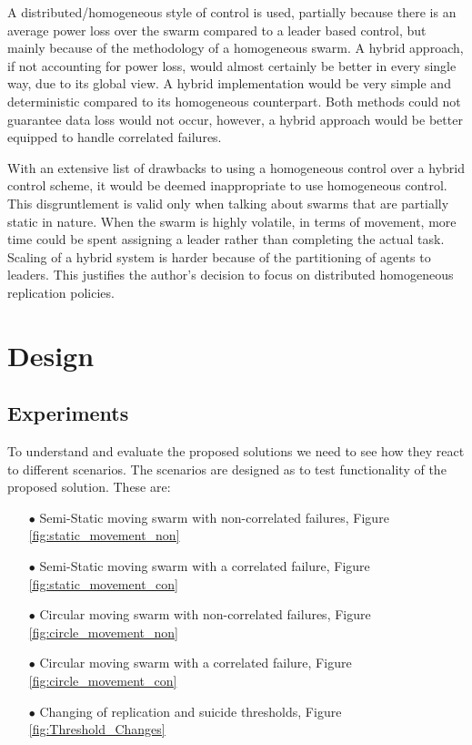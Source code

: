\documentclass{UoYCSproject}
\begin{document}
A distributed/homogeneous style of control is used, partially because there is an average power loss over the swarm compared to a leader based control, but mainly because of the methodology of a homogeneous swarm. A hybrid approach, if not accounting for power loss, would almost certainly be better in every single way, due to its global view. A hybrid implementation would be very simple and deterministic compared to its homogeneous counterpart. Both methods could not guarantee data loss would not occur, however, a hybrid approach would be better equipped to handle correlated failures.

With an extensive list of drawbacks to using a homogeneous control over a hybrid control scheme, it would be deemed inappropriate to use homogeneous control. This disgruntlement is valid only when talking about swarms that are partially static in nature. When the swarm is highly volatile, in terms of movement, more time could be spent assigning a leader rather than completing the actual task. Scaling of a hybrid system is harder because of the partitioning of agents to leaders. This justifies the author's decision to focus on distributed homogeneous replication policies.




\chapter{Design}
\label{cha:Design}

\section{Experiments}
\label{sec:expriments}

To understand and evaluate the proposed solutions we need to see how they react to different scenarios.
The scenarios are designed as to test functionality of the proposed solution.
These are:

\begin{itemize}
\itemsep-1em
\item[$\bullet$] Semi-Static moving swarm with non-correlated failures, Figure \ref{fig:static_movement_non}
\item[$\bullet$] Semi-Static moving swarm with a correlated failure, Figure \ref{fig:static_movement_con}
\item[$\bullet$] Circular moving swarm with non-correlated failures, Figure \ref{fig:circle_movement_non}
\item[$\bullet$] Circular moving swarm with a correlated failure, Figure \ref{fig:circle_movement_con}
\item[$\bullet$] Changing of replication and suicide thresholds, Figure \ref{fig:Threshold_Changes}
\end{itemize}
\end{document}
